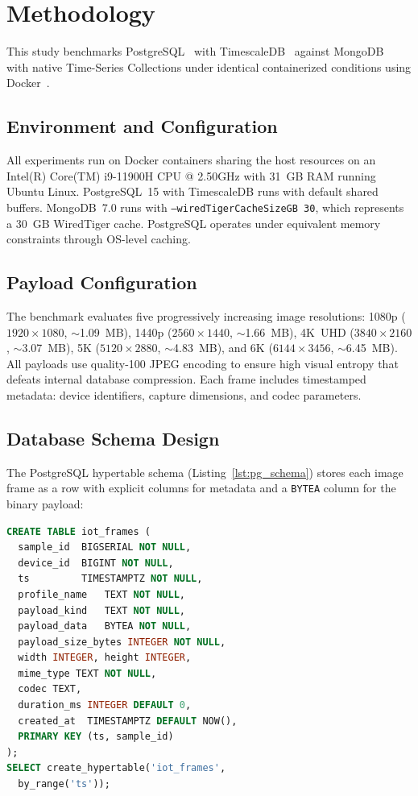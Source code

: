 \documentclass[conference, a4paper]{IEEEtran}
\begin{document}
\section{Methodology}
\label{sec:methodology}

This study benchmarks PostgreSQL~\cite{postgresql_official} with TimescaleDB~\cite{timescaledb_official} against MongoDB~\cite{mongodb_official} with native Time-Series Collections under identical containerized conditions using Docker~\cite{docker_official}.

\subsection{Environment and Configuration}
All experiments run on Docker containers sharing the host resources on an Intel(R) Core(TM) i9-11900H CPU @ 2.50GHz with 31~GB RAM running Ubuntu Linux. PostgreSQL~15 with TimescaleDB runs with default shared buffers. MongoDB~7.0 runs with \texttt{--wiredTigerCacheSizeGB~30}, which represents a  30~GB WiredTiger cache. PostgreSQL operates under equivalent memory constraints through OS-level caching.

\subsection{Payload Configuration}
The benchmark evaluates five progressively increasing image resolutions: 1080p ($1920{\times}1080$, $\sim$1.09~MB), 1440p ($2560{\times}1440$, $\sim$1.66~MB), 4K~UHD ($3840{\times}2160$, $\sim$3.07~MB), 5K ($5120{\times}2880$, $\sim$4.83~MB), and 6K ($6144{\times}3456$, $\sim$6.45~MB). All payloads use quality-100 JPEG encoding to ensure high visual entropy that defeats internal database compression. Each frame includes timestamped metadata: device identifiers, capture dimensions, and codec parameters.

\subsection{Database Schema Design}
The PostgreSQL hypertable schema (Listing~\ref{lst:pg_schema}) stores each image frame as a row with explicit columns for metadata and a \texttt{BYTEA} column for the binary payload:

\begin{lstlisting}[language=SQL,basicstyle=\ttfamily\scriptsize,breaklines=true,caption={PostgreSQL (TimescaleDB) table schema.},label={lst:pg_schema}]
CREATE TABLE iot_frames (
  sample_id  BIGSERIAL NOT NULL,
  device_id  BIGINT NOT NULL,
  ts         TIMESTAMPTZ NOT NULL,
  profile_name   TEXT NOT NULL,
  payload_kind   TEXT NOT NULL,
  payload_data   BYTEA NOT NULL,
  payload_size_bytes INTEGER NOT NULL,
  width INTEGER, height INTEGER,
  mime_type TEXT NOT NULL,
  codec TEXT,
  duration_ms INTEGER DEFAULT 0,
  created_at  TIMESTAMPTZ DEFAULT NOW(),
  PRIMARY KEY (ts, sample_id)
);
SELECT create_hypertable('iot_frames',
  by_range('ts'));
\end{lstlisting}
\end{document}
